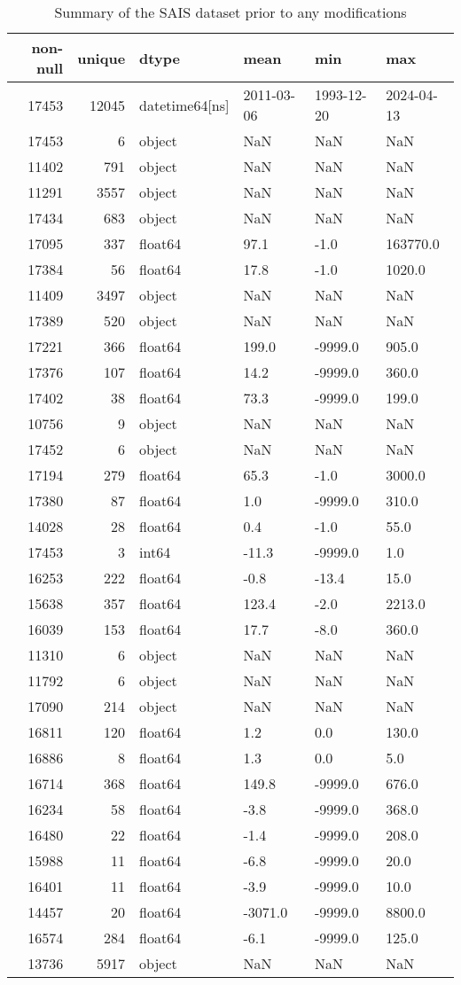 \begin{table}[h]
\caption{Summary of the SAIS dataset prior to any modifications}
\label{tbl:sais_summary_initial}
\begin{tabular}{rrllll}
\toprule
non-null & unique & dtype & mean & min & max \\
\midrule
17453 & 12045 & datetime64[ns] & 2011-03-06 & 1993-12-20 & 2024-04-13 \\
17453 & 6 & object & NaN & NaN & NaN \\
11402 & 791 & object & NaN & NaN & NaN \\
11291 & 3557 & object & NaN & NaN & NaN \\
17434 & 683 & object & NaN & NaN & NaN \\
17095 & 337 & float64 & 97.1 & -1.0 & 163770.0 \\
17384 & 56 & float64 & 17.8 & -1.0 & 1020.0 \\
11409 & 3497 & object & NaN & NaN & NaN \\
17389 & 520 & object & NaN & NaN & NaN \\
17221 & 366 & float64 & 199.0 & -9999.0 & 905.0 \\
17376 & 107 & float64 & 14.2 & -9999.0 & 360.0 \\
17402 & 38 & float64 & 73.3 & -9999.0 & 199.0 \\
10756 & 9 & object & NaN & NaN & NaN \\
17452 & 6 & object & NaN & NaN & NaN \\
17194 & 279 & float64 & 65.3 & -1.0 & 3000.0 \\
17380 & 87 & float64 & 1.0 & -9999.0 & 310.0 \\
14028 & 28 & float64 & 0.4 & -1.0 & 55.0 \\
17453 & 3 & int64 & -11.3 & -9999.0 & 1.0 \\
16253 & 222 & float64 & -0.8 & -13.4 & 15.0 \\
15638 & 357 & float64 & 123.4 & -2.0 & 2213.0 \\
16039 & 153 & float64 & 17.7 & -8.0 & 360.0 \\
11310 & 6 & object & NaN & NaN & NaN \\
11792 & 6 & object & NaN & NaN & NaN \\
17090 & 214 & object & NaN & NaN & NaN \\
16811 & 120 & float64 & 1.2 & 0.0 & 130.0 \\
16886 & 8 & float64 & 1.3 & 0.0 & 5.0 \\
16714 & 368 & float64 & 149.8 & -9999.0 & 676.0 \\
16234 & 58 & float64 & -3.8 & -9999.0 & 368.0 \\
16480 & 22 & float64 & -1.4 & -9999.0 & 208.0 \\
15988 & 11 & float64 & -6.8 & -9999.0 & 20.0 \\
16401 & 11 & float64 & -3.9 & -9999.0 & 10.0 \\
14457 & 20 & float64 & -3071.0 & -9999.0 & 8800.0 \\
16574 & 284 & float64 & -6.1 & -9999.0 & 125.0 \\
13736 & 5917 & object & NaN & NaN & NaN \\
\bottomrule
\end{tabular}
\end{table}
